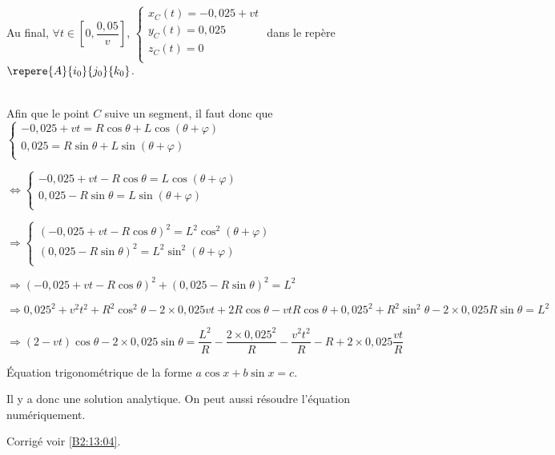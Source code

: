 Au final, $\forall t \in \left[0,\dfrac{0,05}{v}\right]$, $\left\{
\begin{array}{l}
x_C(t)= -0,025+vt\\
y_C(t)= 0,025\\
z_C(t)= 0\\
\end{array}
\right.
$ dans le repère $\repere{A}{i_0}{j_0}{k_0}$.


\else
\fi

\ifprof ~\\
Afin que le point $C$ suive un segment, il faut donc que 
$\left\{
\begin{array}{l}
-0,025+vt= R\cos\theta  +L\cos\left(\theta+\varphi\right)  \\
0,025 = R \sin\theta + L\sin\left(\theta+\varphi\right)\\
\end{array}
\right.
$

$\Leftrightarrow 
\left\{
\begin{array}{l}
-0,025+vt- R\cos\theta  =L\cos\left(\theta+\varphi\right)  \\
0,025 - R \sin\theta  = L\sin\left(\theta+\varphi\right)\\
\end{array}
\right.
$

$\Rightarrow 
\left\{
\begin{array}{l}
\left(-0,025+vt- R\cos\theta\right)^2  =L^2\cos^2\left(\theta+\varphi\right)  \\
\left(0,025 - R \sin\theta  \right)^2= L^2\sin^2\left(\theta+\varphi\right)\\
\end{array}
\right.
$

$\Rightarrow 
\left(-0,025+vt- R\cos\theta\right)^2  + \left(0,025 - R \sin\theta  \right)^2 = L^2
$

$\Rightarrow 
0,025^2+v^2t^2+R^2\cos^2\theta -2\times 0,025 vt+2R\cos\theta-vtR\cos\theta
  + 0,025^2 + R^2 \sin^2\theta -2\times 0,025 R \sin\theta  =      L^2
$

$\Rightarrow 
\left(2-vt\right)\cos\theta  -2\times 0,025  \sin\theta  =      \dfrac{L^2}{R} - \dfrac{2\times0,025^2}{R}-\dfrac{v^2t^2}{R}-R +2\times 0,025 \dfrac{vt}{R}
$


Équation trigonométrique de la forme $a\cos x  + b\sin x =c$.

Il y a donc une solution analytique. On peut aussi résoudre l'équation numériquement.



\else
\fi


\ifprof
\else
\fi


\ifprof
\else
\begin{flushright}
\footnotesize{Corrigé  voir \ref{B2:13:04}.}
\end{flushright}%
\fi